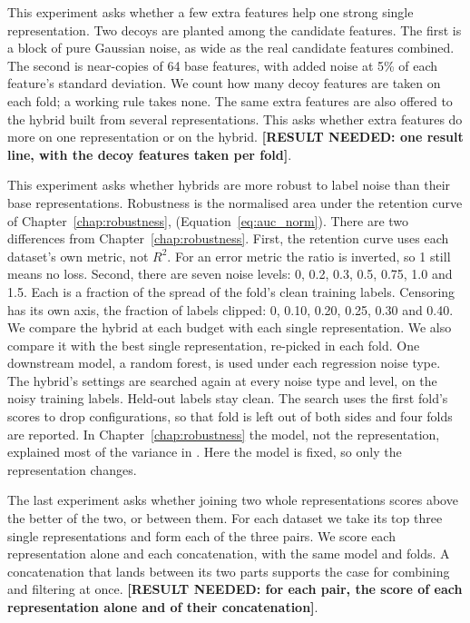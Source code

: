 This experiment asks whether a few extra features help one strong single representation. Two decoys are planted among the candidate features. The first is a block of pure Gaussian noise, as wide as the real candidate features combined. The second is near-copies of 64 base features, with added noise at 5\% of each feature's standard deviation. We count how many decoy features are taken on each fold; a working rule takes none. The same extra features are also offered to the hybrid built from several representations. This asks whether extra features do more on one representation or on the hybrid. \textbf{[RESULT NEEDED: one result line, with the decoy features taken per fold]}.

This experiment asks whether hybrids are more robust to label noise than their base representations. Robustness is the normalised area under the retention curve of Chapter~\ref{chap:robustness}, \aucnorm (Equation~\ref{eq:auc_norm}). There are two differences from Chapter~\ref{chap:robustness}. First, the retention curve uses each dataset's own metric, not $R^2$. For an error metric the ratio is inverted, so 1 still means no loss. Second, there are seven noise levels: 0, 0.2, 0.3, 0.5, 0.75, 1.0 and 1.5. Each is a fraction of the spread of the fold's clean training labels. Censoring has its own axis, the fraction of labels clipped: 0, 0.10, 0.20, 0.25, 0.30 and 0.40. We compare the hybrid at each budget with each single representation. We also compare it with the best single representation, re-picked in each fold. One downstream model, a random forest, is used under each regression noise type. The hybrid's settings are searched again at every noise type and level, on the noisy training labels. Held-out labels stay clean. The search uses the first fold's scores to drop configurations, so that fold is left out of both sides and four folds are reported. In Chapter~\ref{chap:robustness} the model, not the representation, explained most of the variance in \aucnorm. Here the model is fixed, so only the representation changes.

The last experiment asks whether joining two whole representations scores above the better of the two, or between them. For each dataset we take its top three single representations and form each of the three pairs. We score each representation alone and each concatenation, with the same model and folds. A concatenation that lands between its two parts supports the case for combining and filtering at once. \textbf{[RESULT NEEDED: for each pair, the score of each representation alone and of their concatenation]}.


